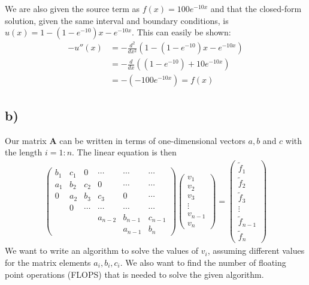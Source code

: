 \documentclass[12pt]{article}
\begin{document}
We are also given the source term as $f(x) = 100e^{-10x}$ and that the closed-form solution, given the same interval and boundary conditions, is $u(x) = 1 - \left(1-e^{-10} \right)x - e^{-10x}$. This can easily be shown:
\begin{align}
-u''(x) &= -\frac{d^2}{dx^2} \left( 1 - \left(1-e^{-10} \right) x - e^{-10x} \right) \nonumber \\
&= - \frac{d}{dx}\left((1-e^{-10}) + 10e^{-10x} \right) \nonumber\\
&= -\left(-100e^{-10x} \right) = f(x)
\end{align}
\subsection*{b)}
Our matrix $\mathbf{A}$ can be written in terms of one-dimensional vectors $a,b$ and $c$ with the length $i=1:n$. The linear equation is then
\begin{align}
\begin{pmatrix}
b_1 & c_1 & 0 & \cdots & \cdots & \cdots \\
a_1 & b_2 & c_2 & 0 & \cdots & \cdots \\
0 & a_2 & b_3 & c_3 & 0 & \cdots \\
 & 0 & \cdots & \cdots & \cdots & \cdots \\
 & & & a_{n-2} & b_{n-1} & c_{n-1} \\
 & & & & a_{n-1} & b_n
\end{pmatrix}
\begin{pmatrix}
v_1 \\
v_2 \\
v_3 \\
\vdots \\
v_{n-1} \\
v_n
\end{pmatrix}
=
\begin{pmatrix}
\tilde{f}_1 \\
\tilde{f}_2 \\
\tilde{f}_3 \\
\vdots \\
\tilde{f}_{n-1} \\
\tilde{f}_n
\end{pmatrix}
\end{align}
We want to write an algorithm to solve the values of $v_i$, assuming different values for the matrix elements $a_i, b_i, c_i$. We also want to find the number of floating point operations (FLOPS) that is needed to solve the given algorithm.
\end{document}
